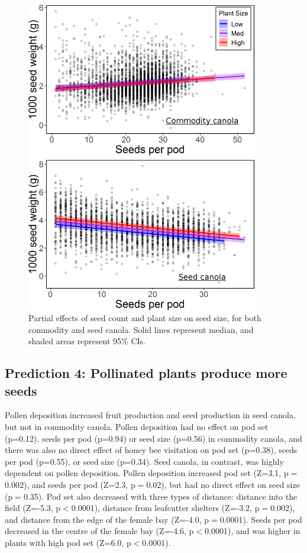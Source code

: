 \documentclass[12pt]{article} %
\begin{document}
\begin{figure}
    \centering
    \includegraphics[width=0.9\textwidth,keepaspectratio=true]{seedWeightSeedCount_both.png}
    \caption[Partial effects of seed count and plant size on seed size]{Partial effects of seed count and plant size on seed size, for both commodity and seed canola. Solid lines represent median, and shaded areas represent 95\% CIs.}
    \label{fig:seedWeightCount_both}
\end{figure}

\subsection{Prediction 4: Pollinated plants produce more seeds}

Pollen deposition increased fruit production and seed production in seed canola, but not in commodity canola.
Pollen deposition had no effect on pod set (p=0.12), seeds per pod (p=0.94) or seed size (p=0.56) in commodity canola, and there was also no direct effect of honey bee visitation on pod set (p=0.38), seeds per pod (p=0.55), or seed size (p=0.34).
Seed canola, in contrast, was highly dependent on pollen deposition.
Pollen deposition increased pod set (Z=3.1, p$=$0.002), and seeds per pod (Z=2.3, p$=$0.02), but had no direct effect on seed size (p$=$0.35).
Pod set also decreased with three types of distance: distance into the field (Z=-5.3, p$<$0.0001), distance from leafcutter shelters (Z=-3.2, p$=$0.002), and distance from the edge of the female bay (Z=-4.0, p$=$0.0001).
Seeds per pod decreased in the centre of the female bay (Z=-4.6, p$<$0.0001), and was higher in plants with high pod set (Z=6.0, p$<$0.0001).
\end{document}
